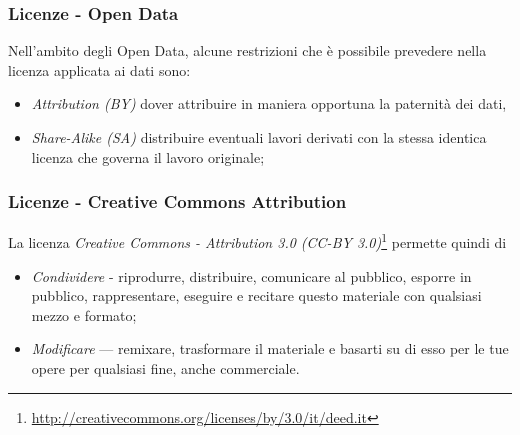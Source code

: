 \documentclass[8pt]{beamer}
\begin{document}
\begin{frame}
\frametitle{Licenze - Open Data}

Nell'ambito degli Open Data, alcune restrizioni che \`e possibile prevedere nella licenza
applicata ai dati sono:

\begin{itemize}[<+->]
 \item \emph{Attribution (BY)} dover attribuire in maniera opportuna la paternit\`a dei dati, 
 \item \emph{Share-Alike (SA)} distribuire eventuali lavori derivati con la stessa identica licenza che governa il lavoro originale;
\end{itemize}
\end{frame}

\begin{frame}
\frametitle{Licenze - Creative Commons Attribution}
La licenza \emph{Creative Commons - Attribution 3.0 (CC-BY 3.0)}\footnote{\url{http://creativecommons.org/licenses/by/3.0/it/deed.it}}
permette quindi di
\begin{itemize}
 \item \emph{Condividere} - riprodurre, distribuire, comunicare al pubblico, esporre in pubblico, 
 rappresentare, eseguire e recitare questo materiale con qualsiasi mezzo e formato;
 \item \emph{Modificare} — remixare, trasformare il materiale e basarti su di esso per le tue opere
per qualsiasi fine, anche commerciale.
\end{itemize}


\end{frame}
\end{document}
